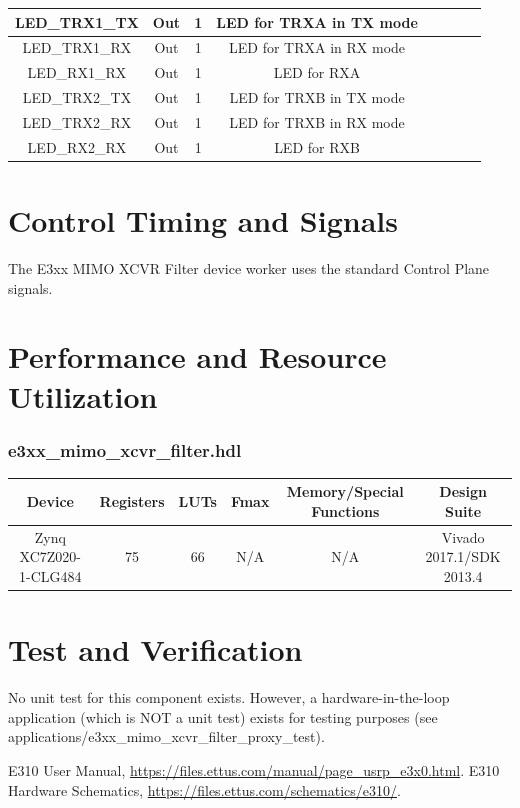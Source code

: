 \documentclass{article}
\def\comp{e3xx\_mimo\_xcvr\_filter}
\begin{document}
\begin{landscape}
\begin{scriptsize}
\begin{tabular}{|c|c|c|c|p{2.6cm}|c|c|c|}
			\hline
			LED\_TRX1\_TX     & Out & 1     & LED for TRXA in TX mode   \\
			\hline
			LED\_TRX1\_RX     & Out & 1     & LED for TRXA in RX mode   \\
			\hline
			LED\_RX1\_RX      & Out & 1     & LED for RXA \\
			\hline
			LED\_TRX2\_TX     & Out & 1     & LED for TRXB in TX mode   \\
			\hline
			LED\_TRX2\_RX     & Out & 1     & LED for TRXB in RX mode   \\
			\hline
			LED\_RX2\_RX      & Out & 1     & LED for RXB \\
			\hline
		\end{tabular}
	\end{scriptsize}
\end{landscape}

\section*{Control Timing and Signals}
The E3xx MIMO XCVR Filter device worker uses the standard Control Plane signals.

\section*{Performance and Resource Utilization}
\subsubsection*{\comp.hdl}
\begin{scriptsize}
	\begin{tabular}{|c|c|c|c|c|c|}
		\hline
		\rowcolor{blue}
		Device             & Registers & LUTs & Fmax        & Memory/Special Functions & Design Suite \\
		\hline
		Zynq XC7Z020-1-CLG484 & 75      & 66  & N/A & N/A                         & Vivado 2017.1/SDK 2013.4    \\
		\hline
	\end{tabular}
\end{scriptsize}

\section*{Test and Verification}
No unit test for this component exists. However, a hardware-in-the-loop application (which is NOT a unit test) exists for testing purposes (see applications/e3xx\_mimo\_xcvr\_filter\_proxy\_test).

\begin{thebibliography}{2}
  E310 User Manual,
  \url{https://files.ettus.com/manual/page\_usrp\_e3x0.html}.
  E310 Hardware Schematics,
  \url{https://files.ettus.com/schematics/e310/}.
\end{thebibliography}
\end{document}
